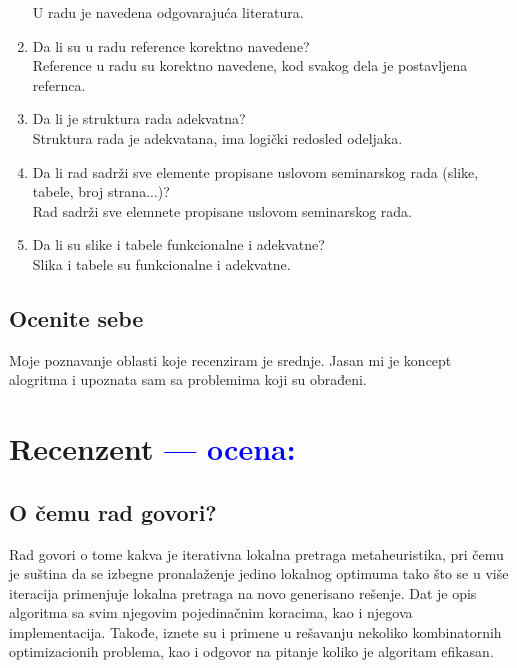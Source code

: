 \documentclass[a4paper]{report}
\newcommand{\odgovor}[1]{\textcolor{blue}{#1}}
\begin{document}
\begin{enumerate}
U radu je navedena odgovarajuća literatura.
\item Da li su u radu reference korektno navedene?\\
Reference u radu su korektno navedene, kod svakog dela je postavljena refernca.
\item Da li je struktura rada adekvatna?\\
Struktura rada je adekvatana, ima logički redosled odeljaka.
\item Da li rad sadrži sve elemente propisane uslovom seminarskog rada (slike, tabele, broj strana...)?\\
Rad sadrži sve elemnete propisane uslovom seminarskog rada.
\item Da li su slike i tabele funkcionalne i adekvatne?\\
Slika i tabele su funkcionalne i adekvatne.
\end{enumerate}


\section{Ocenite sebe}

Moje poznavanje oblasti koje recenziram je srednje. Jasan mi je koncept alogritma i upoznata sam sa problemima koji su obrađeni.


\chapter{Recenzent \odgovor{--- ocena:} }


\section{O čemu rad govori?}
Rad govori o tome kakva je iterativna lokalna pretraga metaheuristika, pri čemu je suština da se izbegne pronalaženje jedino lokalnog optimuma tako što se u više iteracija primenjuje lokalna pretraga na novo generisano rešenje. Dat je opis algoritma sa svim njegovim pojedinačnim koracima, kao i njegova implementacija. Takođe, iznete su i primene u rešavanju nekoliko kombinatornih optimizacionih problema, kao i odgovor na pitanje koliko je algoritam efikasan.
\end{document}
